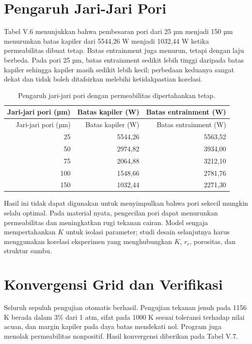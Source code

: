 \documentclass[
  12pt,a4paper,oneside]{report}
\begin{document}
\hypertarget{pengaruh-jari-jari-pori}{%
\section{Pengaruh Jari-Jari Pori}\label{pengaruh-jari-jari-pori}}

Tabel V.6 menunjukkan bahwa pembesaran pori dari 25 µm menjadi 150 µm
menurunkan batas kapiler dari 5544,26 W menjadi 1032,44 W ketika
permeabilitas dibuat tetap. Batas entrainment juga menurun, tetapi
dengan laju berbeda. Pada pori 25 µm, batas entrainment sedikit lebih
tinggi daripada batas kapiler sehingga kapiler masih sedikit lebih
kecil; perbedaan keduanya sangat dekat dan tidak boleh ditafsirkan
melebihi ketidakpastian korelasi.

\begin{longtable}[]{@{}rrr@{}}
\caption{Pengaruh jari-jari pori dengan permeabilitas dipertahankan
tetap.}\tabularnewline
\toprule
Jari-jari pori (µm) & Batas kapiler (W) & Batas entrainment (W) \\
\midrule
\endfirsthead
\toprule
Jari-jari pori (µm) & Batas kapiler (W) & Batas entrainment (W) \\
\midrule
\endhead
25 & 5544,26 & 5563,52 \\
50 & 2974,82 & 3934,00 \\
75 & 2064,88 & 3212,10 \\
100 & 1548,66 & 2781,76 \\
150 & 1032,44 & 2271,30 \\
\bottomrule
\end{longtable}

Hasil ini tidak dapat digunakan untuk menyimpulkan bahwa pori sekecil
mungkin selalu optimal. Pada material nyata, pengecilan pori dapat
menurunkan permeabilitas dan meningkatkan rugi tekanan cairan. Model
sengaja mempertahankan \(K\) untuk isolasi parameter; studi desain
selanjutnya harus menggunakan korelasi eksperimen yang menghubungkan
\(K\), \(r_c\), porositas, dan struktur sumbu.

\hypertarget{konvergensi-grid-dan-verifikasi}{%
\section{Konvergensi Grid dan
Verifikasi}\label{konvergensi-grid-dan-verifikasi}}

Seluruh sepuluh pengujian otomatis berhasil. Pengujian tekanan jenuh
pada 1156 K berada dalam 3\% dari 1 atm, sifat pada 1000 K sesuai
toleransi terhadap nilai acuan, dan margin kapiler pada daya batas
mendekati nol. Program juga menolak permeabilitas nonpositif. Hasil
konvergensi diberikan pada Tabel V.7.
\end{document}
